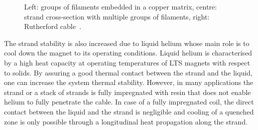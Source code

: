 \begin{figure}[H]
    \centering
    \caption{Left: groups of filaments embedded in a copper matrix, centre: strand cross-section with multiple groups of filaments, right: Rutherford cable~\cite{lhc_machine_outreach}.}
    \label{fig:strand_and_filaments}
\end{figure}

The strand stability is also increased due to liquid helium whose main role is to cool down the magnet to its operating conditions. Liquid helium is characterised by a high heat capacity at operating temperatures of LTS magnets with respect to solids. By assuring a good thermal contact between the strand and the liquid, one can increase the system thermal stability. However, in many applications the strand or a stack of strands is fully impregnated with resin that does not enable helium to fully penetrate the cable. In case of a fully impregnated coil, the direct contact between the liquid and the strand is negligible and cooling of a quenched zone is only possible through a longitudinal heat propagation along the strand.~\cite[p.~122]{superconducting_accelerator_magnets}

